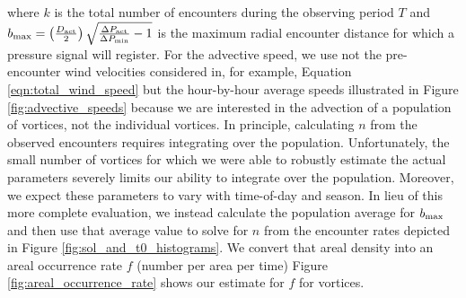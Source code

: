 \documentclass[linenumbers,trackchanges]{aastex63}
\begin{document}
where $k$ is the total number of encounters during the observing period $T$ and $b_{\rm max} = \left( \frac{D_{\rm act}}{2} \right) \sqrt{ \frac{\Delta P_{\rm act}}{\Delta P_{\rm min}} - 1 }$ is the maximum radial encounter distance for which a pressure signal will register.  For the advective speed, we use not the pre-encounter wind velocities considered in, for example, Equation \ref{eqn:total_wind_speed} but the hour-by-hour average speeds illustrated in Figure \ref{fig:advective_speeds} because we are interested in the advection of a population of vortices, not the individual vortices. In principle, calculating $n$ from the observed encounters requires integrating over the population. Unfortunately, the small number of vortices for which we were able to robustly estimate the actual parameters severely limits our ability to integrate over the population.  Moreover, we expect these parameters to vary with time-of-day and season. In lieu of this more complete evaluation, we instead calculate the population average for $b_{\rm max}$ and then use that average value to solve for $n$ from the encounter rates depicted in Figure \ref{fig:sol_and_t0_histograms}. We convert that areal density into an areal occurrence rate $f$ (number per area per time) 
 Figure \ref{fig:areal_occurrence_rate} shows our estimate for $f$ for vortices.
\end{document}
